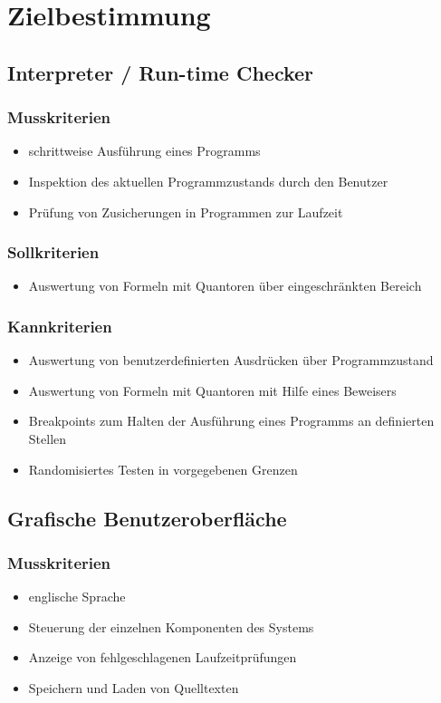 \documentclass[a4paper,10pt]{article}
\begin{document}
\section{Zielbestimmung}
\subsection{Interpreter / Run-time Checker}
\subsubsection{Musskriterien}
\begin{itemize}
  \item schrittweise Ausf\"{u}hrung eines Programms
  \item Inspektion des aktuellen Programmzustands durch den Benutzer
  \item Pr\"{u}fung von Zusicherungen in Programmen zur Laufzeit
\end{itemize}
\subsubsection{Sollkriterien}
\begin{itemize}
  \item Auswertung von Formeln mit Quantoren \"{u}ber eingeschr\"{a}nkten Bereich
\end{itemize}
\subsubsection{Kannkriterien}
\begin{itemize}
  \item Auswertung von benutzerdefinierten Ausdr\"{u}cken \"{u}ber Programmzustand
  \item Auswertung von Formeln mit Quantoren mit Hilfe eines Beweisers
  \item Breakpoints zum Halten der Ausf\"{u}hrung eines Programms an definierten Stellen
  \item Randomisiertes Testen in vorgegebenen Grenzen
\end{itemize}

\subsection{Grafische Benutzeroberfl\"{a}che}
\subsubsection{Musskriterien}
\begin{itemize}
  \item englische Sprache
  \item Steuerung der einzelnen Komponenten des Systems
  \item Anzeige von fehlgeschlagenen Laufzeitpr\"{u}fungen
  \item Speichern und Laden von Quelltexten
\end{itemize}
\end{document}
